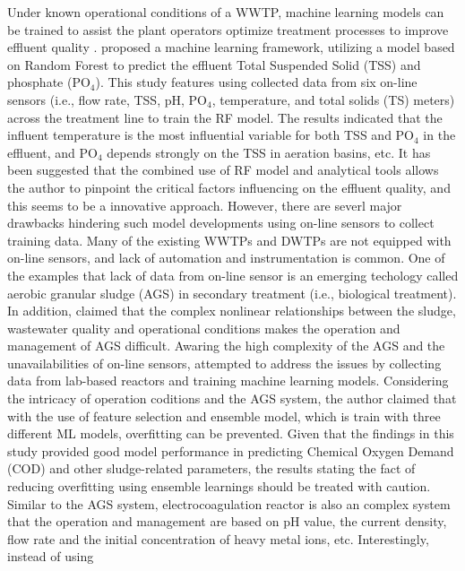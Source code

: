 

Under known operational conditions of a WWTP, machine learning models can be trained to assist the plant operators optimize treatment processes to improve effluent quality . \citet{wangMachineLearningFramework2021} proposed a machine learning framework, utilizing a model based on Random Forest to predict the effluent Total Suspended Solid (TSS) and phosphate (PO$_4$). This study features using collected data from six on-line sensors (i.e., flow rate, TSS, pH, PO$_4$, temperature, and total solids (TS) meters) across the treatment line to train the RF model. The results indicated that the influent temperature is the most influential variable for both TSS and PO$_4$ in the effluent, and PO$_4$ depends strongly on the TSS in aeration basins, etc. It has been suggested that the combined use of RF model and analytical tools allows the author to pinpoint the critical factors influencing on the effluent quality, and this seems to be a innovative approach. However, there are severl major drawbacks hindering such model developments using on-line sensors to collect training data. Many of the existing WWTPs and DWTPs are not equipped with on-line sensors, and lack of automation and instrumentation is common. One of the examples that lack of data from on-line sensor is an emerging techology called aerobic granular sludge (AGS) in secondary treatment (i.e., biological treatment). In addition, \citet{wilenMechanismsGranulationActivated2018} claimed that the complex nonlinear relationships between the sludge, wastewater quality and operational conditions makes the operation and management of AGS difficult. Awaring the high complexity of the AGS and the unavailabilities of on-line sensors, \citet{zaghloulDevelopmentEnsembleMachine2021} attempted to address the issues by collecting data from lab-based reactors and training machine learning models. Considering the intricacy of operation coditions and the AGS system, the author claimed that with the use of feature selection and ensemble model, which is train with three different ML models, overfitting can be prevented. Given that the findings in this study provided good model performance in predicting Chemical Oxygen Demand (COD) and other sludge-related parameters, the results stating the fact of reducing overfitting using ensemble learnings should be treated with caution. Similar to the AGS system, electrocoagulation reactor is also an complex system that the operation and management are based on pH value, the current density, flow rate and the initial concentration of heavy metal ions, etc. Interestingly, instead of using 